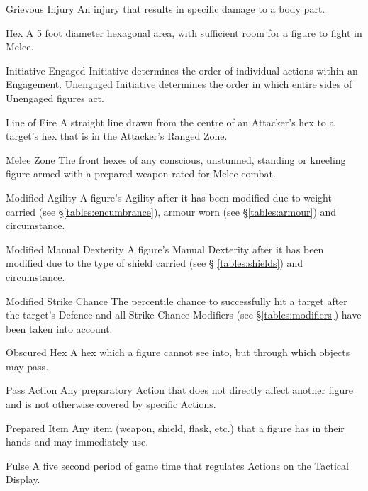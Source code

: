 \begin{multicols*}{3}
\begin{Description}
\item[Grievous Injury] An injury that results in specific damage to a body
part.

\item[Hex] A 5 foot diameter hexagonal area, with sufficient room for a figure
to fight in Melee.

\item[Initiative] Engaged Initiative determines the order of individual
actions within an Engagement. Unengaged Initiative determines the
order in which entire sides of Unengaged figures act.

\item[Line of Fire] A straight line drawn from the centre of an Attacker's
hex to a target's hex that is in the Attacker's Ranged Zone.

\item[Melee Zone] The front hexes of any conscious, unstunned, standing or
kneeling figure armed with a prepared weapon rated for Melee combat.

\item[Modified Agility] A figure's Agility after it has been modified
due to weight carried (see \S \ref{tables:encumbrance}), armour worn (see
\S \ref{tables:armour}) and circumstance.

\item[Modified Manual Dexterity] A figure's Manual Dexterity after it
has been modified due to the type of shield carried (see \S
\ref{tables:shields}) and circumstance.

\item[Modified Strike Chance] The percentile chance to successfully
hit a target after the target's Defence and all Strike Chance
Modifiers (see \S \ref{tables:modifiers}) have been taken into
account.

\item[Obscured Hex] A hex which a figure cannot see into, but through which
objects may pass.

\item[Pass Action] Any preparatory Action that does not directly affect
another figure and is not otherwise covered by specific Actions.

\item[Prepared Item] Any item (weapon, shield, flask, etc.) that a figure
has in their hands and may immediately use.

\item[Pulse] A five second period of game time that regulates Actions on the
Tactical Display.


\end{Description}
\end{multicols*}
